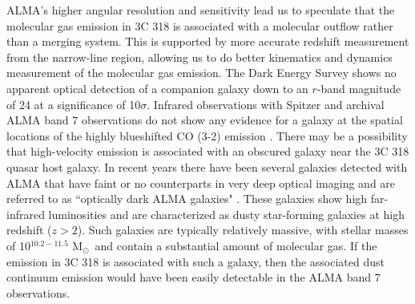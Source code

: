 \documentclass[twocolumn]{aastex63}
\newcommand{\msun}{M$_{\odot}$}
\begin{document}
ALMA's higher angular resolution and sensitivity lead us to speculate that the molecular gas emission in 3C 318 is associated with a molecular outflow rather than a merging system. This is supported by more accurate redshift measurement from the narrow-line region, allowing us to do better kinematics and dynamics measurement of the molecular gas emission. The Dark Energy Survey \citep{DES2021} shows no apparent optical detection of a companion galaxy down to an $r$-band magnitude of 24 at a significance of 10$\sigma$. Infrared observations with Spitzer and archival ALMA band 7 observations do not show any evidence for a galaxy at the spatial locations of the highly blueshifted CO (3-2) emission \citep{Barthel19}. There may be a possibility that high-velocity emission is associated with an obscured galaxy near the 3C 318 quasar host galaxy. In recent years there have been several galaxies detected with ALMA that have faint or no counterparts in very deep optical imaging and are referred to as ``optically dark ALMA galaxies" \citep{Williams19,Zhou20}. These galaxies show high far-infrared luminosities and are characterized as dusty star-forming galaxies at high redshift ($z>2$). Such galaxies are typically relatively massive, with stellar masses of 10$^{10.2-11.5}$ \msun\ and contain a substantial amount of molecular gas. If the emission in 3C 318 is associated with such a galaxy, then the associated dust continuum emission would have been easily detectable in the ALMA band 7 observations.\\ 
\end{document}
